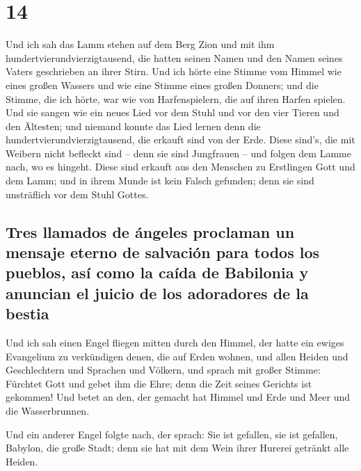 \hypertarget{section-13}{%
\section{14}\label{section-13}}

 Und ich sah das Lamm stehen auf dem Berg Zion und mit ihm
hundertvierundvierzigtausend, die hatten seinen Namen und den Namen
seines Vaters geschrieben an ihrer Stirn.  Und ich hörte
eine Stimme vom Himmel wie eines großen Wassers und wie eine Stimme
eines großen Donners; und die Stimme, die ich hörte, war wie von
Harfenspielern, die auf ihren Harfen spielen.  Und sie
sangen wie ein neues Lied vor dem Stuhl und vor den vier Tieren und den
Ältesten; und niemand konnte das Lied lernen denn die
hundertvierundvierzigtausend, die erkauft sind von der Erde.
 Diese sind's, die mit Weibern nicht befleckt sind -- denn
sie sind Jungfrauen -- und folgen dem Lamme nach, wo es hingeht. Diese
sind erkauft aus den Menschen zu Erstlingen Gott und dem Lamm;
 und in ihrem Munde ist kein Falsch gefunden; denn sie
sind unsträflich vor dem Stuhl Gottes.

\hypertarget{tres-llamados-de-uxe1ngeles-proclaman-un-mensaje-eterno-de-salvaciuxf3n-para-todos-los-pueblos-asuxed-como-la-cauxedda-de-babilonia-y-anuncian-el-juicio-de-los-adoradores-de-la-bestia}{%
\subsection{Tres llamados de ángeles proclaman un mensaje eterno de
salvación para todos los pueblos, así como la caída de Babilonia y
anuncian el juicio de los adoradores de la
bestia}\label{tres-llamados-de-uxe1ngeles-proclaman-un-mensaje-eterno-de-salvaciuxf3n-para-todos-los-pueblos-asuxed-como-la-cauxedda-de-babilonia-y-anuncian-el-juicio-de-los-adoradores-de-la-bestia}}

 Und ich sah einen Engel fliegen mitten durch den Himmel,
der hatte ein ewiges Evangelium zu verkündigen denen, die auf Erden
wohnen, und allen Heiden und Geschlechtern und Sprachen und Völkern,
 und sprach mit großer Stimme: Fürchtet Gott und gebet ihm
die Ehre; denn die Zeit seines Gerichts ist gekommen! Und betet an den,
der gemacht hat Himmel und Erde und Meer und die Wasserbrunnen.

 Und ein anderer Engel folgte nach, der sprach: Sie ist
gefallen, sie ist gefallen, Babylon, die große Stadt; denn sie hat mit
dem Wein ihrer Hurerei getränkt alle Heiden.

